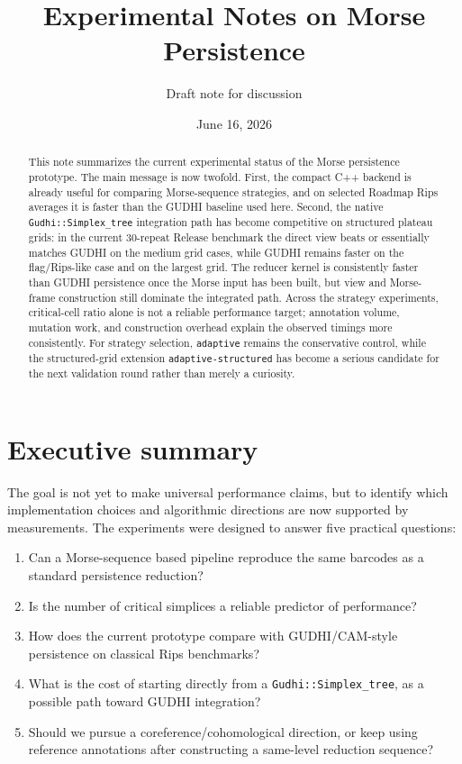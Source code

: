 \documentclass[11pt]{article}
\title{Experimental Notes on Morse Persistence}
\author{Draft note for discussion}
\date{June 16, 2026}
\begin{document}
\maketitle

\begin{abstract}
This note summarizes the current experimental status of the Morse persistence prototype.
The main message is now twofold.  First, the compact C++ backend is already useful for
comparing Morse-sequence strategies, and on selected Roadmap Rips averages it is faster
than the GUDHI baseline used here.  Second, the native \texttt{Gudhi::Simplex\_tree}
integration path has become competitive on structured plateau grids: in the current
30-repeat Release benchmark the direct view beats or essentially matches GUDHI on the
medium grid cases, while GUDHI remains faster on the flag/Rips-like case and on the
largest grid.  The reducer kernel is consistently faster than GUDHI persistence once the
Morse input has been built, but view and Morse-frame construction still dominate the
integrated path.  Across the strategy experiments, critical-cell ratio alone is not a
reliable performance target; annotation volume, mutation work, and construction overhead
explain the observed timings more consistently.  For strategy selection,
\texttt{adaptive} remains the conservative control, while the structured-grid extension
\texttt{adaptive-structured} has become a serious candidate for the next validation round
rather than merely a curiosity.
\end{abstract}

\section{Executive summary}

The goal is not yet to make universal performance claims, but to identify which
implementation choices and algorithmic directions are now supported by measurements.  The
experiments were designed to answer five practical questions:
\begin{enumerate}
  \item Can a Morse-sequence based pipeline reproduce the same barcodes as a standard
        persistence reduction?
  \item Is the number of critical simplices a reliable predictor of performance?
  \item How does the current prototype compare with GUDHI/CAM-style persistence on
        classical Rips benchmarks?
  \item What is the cost of starting directly from a \texttt{Gudhi::Simplex\_tree}, as a
        possible path toward GUDHI integration?
  \item Should we pursue a coreference/cohomological direction, or keep using reference
        annotations after constructing a same-level reduction sequence?
\end{enumerate}
\end{document}
